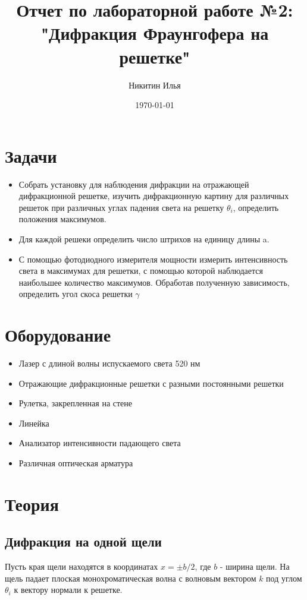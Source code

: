 \documentclass[a4paper,14pt]{extarticle}
\author{Никитин Илья}
\title{Отчет по лабораторной работе №2: "Дифракция Фраунгофера на решетке"}
\date{\today}
\begin{document}
	
	\maketitle
	\tableofcontents

	\section{Задачи}
		\begin{itemize}
			\item Собрать установку для наблюдения дифракции на отражающей дифракционной решетке, изучить дифракционную картину для различных решеток при различных углах падения света на решетку $\theta_i$, определить положения максимумов.
			\item Для каждой решеки определить число штрихов на единицу длины a.
			\item С помощью фотодиодного измерителя мощности измерить интенсивность света в максимумах для решетки, с помощью которой наблюдается наибольшее количество максимумов. Обработав полученную зависимость, определить угол скоса решетки $\gamma$
		\end{itemize}
	\section{Оборудование}
		\begin{itemize}
			\item Лазер с длиной волны испускаемого света 520 нм
			\item Отражающие дифракционные решетки с разными постоянными решетки
			\item Рулетка, закрепленная на стене
			\item Линейка
			\item Анализатор интенсивности падающего света
			\item Различная оптическая арматура
		\end{itemize}
	\section{Теория}
		\subsection{Дифракция на одной щели}
			Пусть края щели находятся в координатах $x = \pm b / 2$, где $b$ - ширина щели. На щель падает плоская монохроматическая волна с волновым вектором $k$ под углом $\theta_i$ к вектору нормали к решетке.
			
\end{document}
